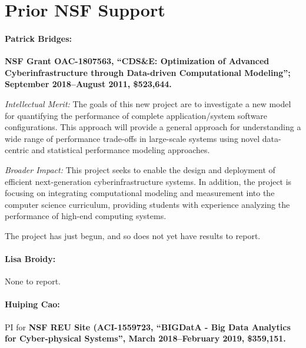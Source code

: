 \section{Prior NSF Support}
\label{sec:prior}

\paragraph{Patrick Bridges:}
\textbf{NSF Grant OAC-1807563, ``CDS\&E: Optimization of Advanced Cyberinfrastructure through Data-driven Computational Modeling''; September 2018--August 2011, \$523,644.}

\noindent\textit{Intellectual Merit:} The goals of this new project are to investigate a new model for quantifying the performance of complete application/system software configurations. This approach will provide a general approach for understanding a wide range of performance trade-offs in large-scale systems using novel data-centric and statistical performance modeling approaches.

\noindent\textit{Broader Impact:} This project seeks to enable the design and deployment of efficient next-generation cyberinfrastructure systems. In addition, the project is focusing on integrating computational modeling and measurement into the computer science curriculum, providing students with experience analyzing the performance of high-end computing systems. 

\noindent The project has just begun, and so does not yet have results to report.

\paragraph{Lisa Broidy:} None to report.

\paragraph{Huiping Cao:} 
PI for {\bf NSF REU Site (ACI-1559723, ``BIGDatA - Big Data Analytics for Cyber-physical Systems'', %
March 2018--February 2019, \$359,151.  } 


